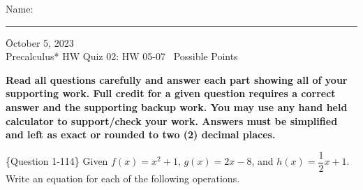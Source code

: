 \documentclass[addpoints, 12pt]{exam}
\begin{document}
\begin{tabbing}
\noindent Name: \rule[-0.1cm]{5cm}{0.01cm} \hspace{2.5in} \= October 5, 2023 \\
Precalculus* HW Quiz 02: HW 05-07 \> \numpoints \ Possible Points
\end{tabbing}

\textbf{Read all questions carefully and answer each part showing all of your supporting work.  Full credit for a given question requires a correct answer and the supporting backup work.  You may use any hand held calculator to support/check your work.  Answers must be simplified and left as exact or rounded to two (2) decimal places.}

\begin{questions}

\question [4] \{Question 1-114\} Given $f(x)=x^2 +1$, $g(x)=2x-8$, and $h(x)=\dfrac{1}{2}x+1$. Write an equation for each of the following operations. \\

\end{questions}
\end{document}
